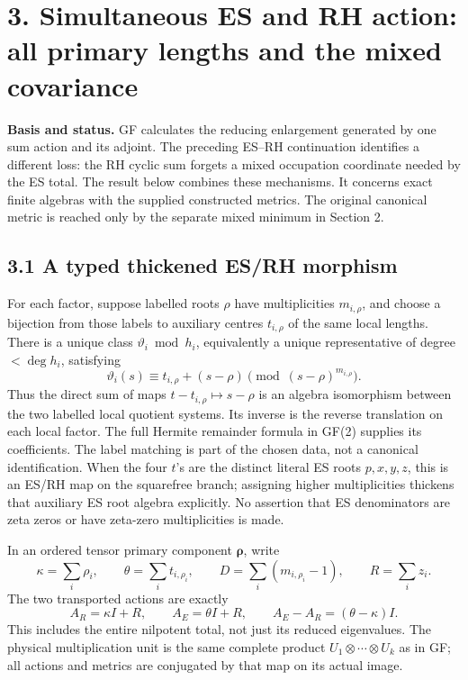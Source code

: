 \documentclass[
  11pt,
]{article}
\begin{document}
\newpage

\section{3. Simultaneous ES and RH action: all primary lengths and the
mixed
covariance}\label{simultaneous-es-and-rh-action-all-primary-lengths-and-the-mixed-covariance}

\textbf{Basis and status.} GF calculates the reducing enlargement
generated by one sum action and its adjoint. The preceding ES--RH
continuation identifies a different loss: the RH cyclic sum forgets a
mixed occupation coordinate needed by the ES total. The result below
combines these mechanisms. It concerns exact finite algebras with the
supplied constructed metrics. The original canonical metric is reached
only by the separate mixed minimum in Section 2.

\subsection{3.1 A typed thickened ES/RH
morphism}\label{a-typed-thickened-esrh-morphism}

For each factor, suppose labelled roots \(\rho\) have multiplicities
\(m_{i,\rho}\), and choose a bijection from those labels to auxiliary
centres \(t_{i,\rho}\) of the same local lengths. There is a unique
class \(\vartheta_i\bmod h_i\), equivalently a unique representative of
degree \(<\deg h_i\), satisfying \[
\vartheta_i(s)\equiv t_{i,\rho}+(s-\rho)\pmod{(s-\rho)^{m_{i,\rho}}}.
\tag{ER1}
\] Thus the direct sum of maps \(t-t_{i,\rho}\mapsto s-\rho\) is an
algebra isomorphism between the two labelled local quotient systems. Its
inverse is the reverse translation on each local factor. The full
Hermite remainder formula in GF(2) supplies its coefficients. The label
matching is part of the chosen data, not a canonical identification.
When the four \(t\)'s are the distinct literal ES roots \(p,x,y,z\),
this is an ES/RH map on the squarefree branch; assigning higher
multiplicities thickens that auxiliary ES root algebra explicitly. No
assertion that ES denominators are zeta zeros or have zeta-zero
multiplicities is made.

In an ordered tensor primary component \(\boldsymbol\rho\), write \[
\kappa=\sum_i\rho_i,\qquad \theta=\sum_i t_{i,\rho_i},\qquad
D=\sum_i(m_{i,\rho_i}-1),\qquad R=\sum_i z_i.
\] The two transported actions are exactly \[
A_R=\kappa I+R,\qquad A_E=\theta I+R,
\qquad A_E-A_R=(\theta-\kappa)I. \tag{ER2}
\] This includes the entire nilpotent total, not just its reduced
eigenvalues. The physical multiplication unit is the same complete
product \(U_1\otimes\cdots\otimes U_k\) as in GF; all actions and
metrics are conjugated by that map on its actual image.
\end{document}
